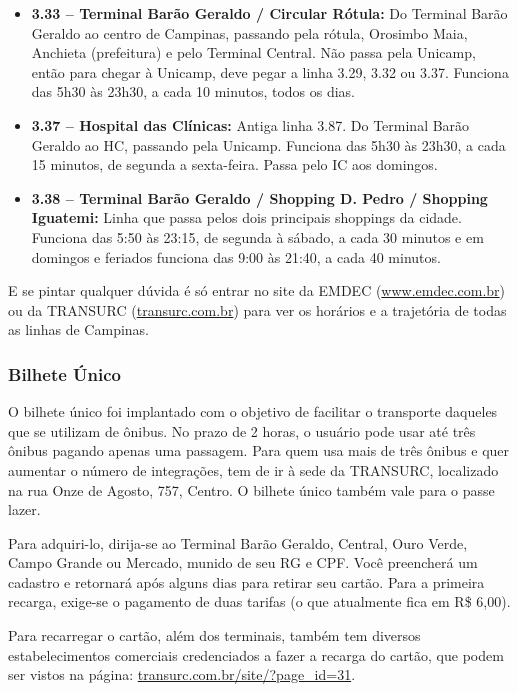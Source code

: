 \begin{itemize}
    \item  \textbf{3.33 -- Terminal Barão Geraldo / Circular Rótula:} Do
        Terminal Barão Geraldo ao centro de Campinas, passando pela rótula,
        Orosimbo Maia, Anchieta (prefeitura) e pelo Terminal Central. Não passa
        pela Unicamp, então para chegar à Unicamp, deve pegar a linha 3.29, 3.32
        ou 3.37. Funciona das 5h30 às 23h30, a cada 10 minutos, todos os dias.

    \item  \textbf{3.37 -- Hospital das Clínicas:} Antiga linha 3.87. Do 
        Terminal Barão Geraldo ao HC, passando pela Unicamp. Funciona das 
        5h30 às 23h30, a cada 15 minutos, de segunda a sexta-feira. Passa 
        pelo IC aos domingos.

    \item  \textbf{3.38 -- Terminal Barão Geraldo / Shopping D. Pedro / Shopping
        Iguatemi:} Linha que passa pelos dois principais shoppings da cidade.
        Funciona das 5:50 às 23:15, de segunda à sábado, a cada 30 minutos e em
        domingos e feriados funciona das 9:00 às 21:40, a cada 40 minutos.
\end{itemize}

E se pintar qualquer dúvida é só entrar no site da EMDEC
(\url{www.emdec.com.br}) ou da TRANSURC (\url{transurc.com.br}) para ver os
horários e a trajetória de todas as linhas de Campinas.

\subsubsection*{Bilhete Único}

O bilhete único foi implantado com o objetivo de facilitar o transporte daqueles
que se utilizam de ônibus. No prazo de 2 horas, o usuário pode usar até três ônibus 
pagando apenas uma passagem. Para quem usa mais de três ônibus e quer aumentar o 
número de integrações, tem de ir à sede da TRANSURC, localizado na rua Onze de Agosto, 
757, Centro. O bilhete único também vale para o passe lazer.

Para adquiri-lo, dirija-se ao Terminal Barão Geraldo, Central, Ouro Verde, Campo
Grande ou Mercado, munido de seu RG e CPF. Você preencherá um cadastro e
retornará após alguns dias para retirar seu cartão. Para a primeira recarga,
exige-se o pagamento de duas tarifas (o que atualmente fica em R\$ 6,00).

Para recarregar o cartão, além dos terminais, também tem diversos
estabelecimentos comerciais credenciados a fazer a recarga do cartão, que podem
ser vistos na página: \url{transurc.com.br/site/?page_id=31}.
